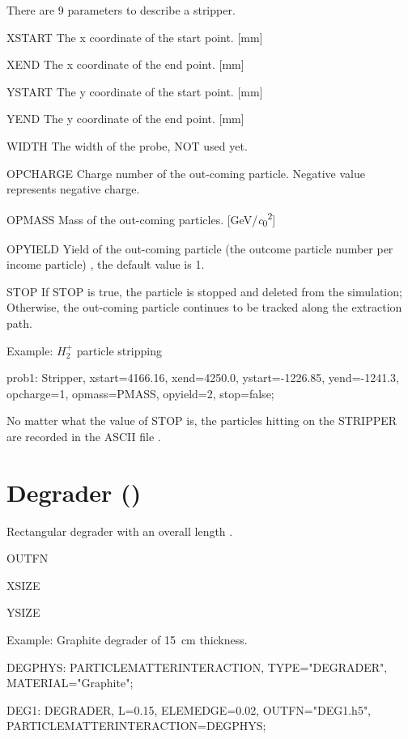  There are 9 parameters to describe a stripper.
\begin{kdescription}
\item[XSTART]
The x coordinate of the start point. [\si{\milli\meter}]
 \item[XEND]
The x coordinate of the end point. [\si{\milli\meter}]
\item[YSTART]
The y coordinate of the start point. [\si{\milli\meter}]
 \item[YEND]
The y coordinate of the end point. [\si{\milli\meter}]
\item[WIDTH]
 The width of the probe, NOT used yet.
\item[OPCHARGE]
Charge number of the out-coming particle. Negative  value represents negative charge.
\item[OPMASS]
Mass of the out-coming particles. [\si{\giga\electronvolt/\clight\squared}]
\item[OPYIELD]
Yield of the out-coming particle (the outcome particle number per income particle) , the default value is 1.
\item[STOP]
If STOP is true, the particle is stopped and deleted from the simulation;
Otherwise, the out-coming particle continues to be tracked along the extraction path.
\end{kdescription}

\noindent Example: $H_2^+$ particle stripping
\begin{example}
prob1: Stripper, xstart=4166.16, xend=4250.0,
ystart=-1226.85, yend=-1241.3,
opcharge=1, opmass=PMASS, opyield=2, stop=false;
\end{example}

No matter what the value of STOP is, the particles hitting on the STRIPPER are recorded in the ASCII file .



\clearpage
\section{Degrader (\opalt)}
Rectangular degrader with an overall length .
\begin{kdescription}
\item[OUTFN]
\item[XSIZE]
\item[YSIZE]
\end{kdescription}
\noindent Example: Graphite degrader of \SI{15}{\centi\meter} thickness.
\begin{example}
DEGPHYS: PARTICLEMATTERINTERACTION, TYPE="DEGRADER", MATERIAL="Graphite";

DEG1: DEGRADER, L=0.15, ELEMEDGE=0.02, OUTFN="DEG1.h5", PARTICLEMATTERINTERACTION=DEGPHYS;
\end{example}




